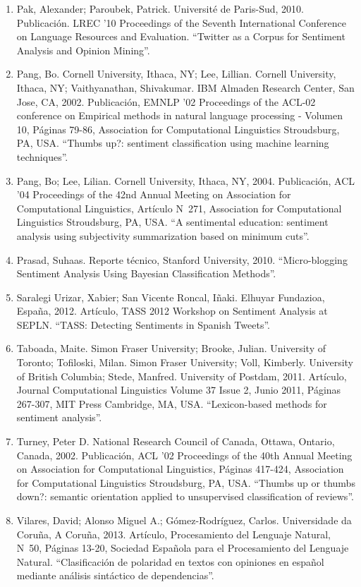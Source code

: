 \begin{enumerate}
\item Pak, Alexander; Paroubek, Patrick. Universit\'e de Paris-Sud, 2010. Publicaci\'on. LREC '10 Proceedings of the Seventh International Conference on Language Resources and Evaluation. ``Twitter as a Corpus for Sentiment Analysis and Opinion Mining''.
\item Pang, Bo. Cornell University, Ithaca, NY; Lee, Lillian. Cornell University, Ithaca, NY; Vaithyanathan, Shivakumar. IBM Almaden Research Center, San Jose, CA, 2002. Publicaci\'on, EMNLP '02 Proceedings of the ACL-02 conference on Empirical methods in natural language processing - Volumen 10, P\'aginas 79-86, Association for Computational Linguistics Stroudsburg, PA, USA. ``Thumbs up?: sentiment classification using machine learning techniques''.
\item Pang, Bo; Lee, Lilian. Cornell University, Ithaca, NY, 2004. Publicaci\'on, ACL '04 Proceedings of the 42nd Annual Meeting on Association for Computational Linguistics, Art\'iculo N\grado \ 271, Association for Computational Linguistics Stroudsburg, PA, USA. ``A sentimental education: sentiment analysis using subjectivity summarization based on minimum cuts''.
\item Prasad, Suhaas. Reporte t\'ecnico, Stanford University, 2010. ``Micro-blogging Sentiment Analysis Using Bayesian Classification Methods''.
\item Saralegi Urizar, Xabier; San Vicente Roncal, I\~naki. Elhuyar Fundazioa, Espa\~na, 2012. Art\'iculo, TASS 2012 Workshop on Sentiment Analysis at SEPLN. ``TASS: Detecting Sentiments in Spanish Tweets''.
\item Taboada, Maite. Simon Fraser University; Brooke, Julian. University of Toronto; Tofiloski, Milan. Simon Fraser University; Voll, Kimberly. University of British Columbia; Stede, Manfred. University of Postdam, 2011. Art\'iculo, Journal Computational Linguistics Volume 37 Issue 2, Junio 2011, P\'aginas 267-307, MIT Press Cambridge, MA, USA. ``Lexicon-based methods for sentiment analysis''.
\item Turney, Peter D. National Research Council of Canada, Ottawa, Ontario, Canada, 2002. Publicaci\'on, ACL '02 Proceedings of the 40th Annual Meeting on Association for Computational Linguistics, P\'aginas 417-424, Association for Computational Linguistics Stroudsburg, PA, USA. ``Thumbs up or thumbs down?: semantic orientation applied to unsupervised classification of reviews''.
\item Vilares, David; Alonso Miguel A.; G\'omez-Rodr\'iguez, Carlos. Universidade da Coru\~na, A Coru\~na, 2013. Art\'iculo, Procesamiento del Lenguaje Natural, N\grado\ 50, P\'aginas 13-20, Sociedad Espa\~nola para el Procesamiento del Lenguaje Natural. ``Clasificaci\'on de polaridad en textos con opiniones en espa\~nol mediante an\'alisis sint\'actico de dependencias''.

\end{enumerate}
